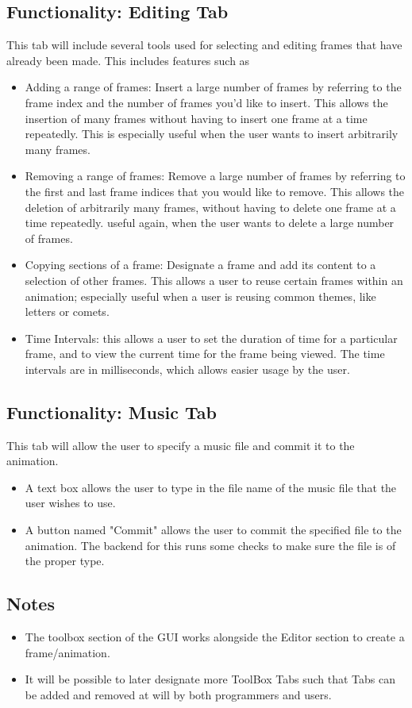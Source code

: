 \documentclass{article}
\begin{document}
	\subsection{Functionality: Editing Tab}
	This tab will include several tools used for selecting and editing frames that have already been made. This includes features such as
	\begin{itemize}
			\item Adding a range of frames: Insert a large number of frames by referring to the frame index and the number of frames you'd like to insert.  This allows the insertion of many frames without having to insert one frame at a time repeatedly.  This is especially useful when the user wants to insert arbitrarily many frames.
			\item Removing a range of frames: Remove a large number of frames by referring to the first and last frame indices that you would like to remove.  This allows the deletion of arbitrarily many frames, without having to delete one frame at a time repeatedly.  useful again, when the user wants to delete a large number of frames.
			\item Copying sections of a frame: Designate a frame and add its content to a selection of other frames.  This allows a user to reuse certain frames within an animation; especially useful when a user is reusing common themes, like letters or comets.
			\item Time Intervals: this allows a user to set the duration of time for a particular frame, and to view the current time for the frame being viewed.  The time intervals are in milliseconds, which allows easier usage by the user.
	\end{itemize}
	

	\subsection{Functionality: Music Tab }
	This tab will allow the user to specify a music file and commit it to the animation.
	\begin{itemize}
		\item A text box allows the user to type in the file name of the music file that the user wishes to use.  
		\item A button named "Commit" allows the user to commit the specified file to the animation.  The backend for this runs some checks to make sure the file is of the proper type.
	\end{itemize}

	\subsection{Notes}
	\begin{itemize}
		\item The toolbox section of the GUI works alongside the Editor section to create a frame/animation. 

		\item It will be possible to later designate more ToolBox Tabs such that Tabs can be added and removed at will by both programmers and users.
	\end{itemize}

	
	
\end{document}
